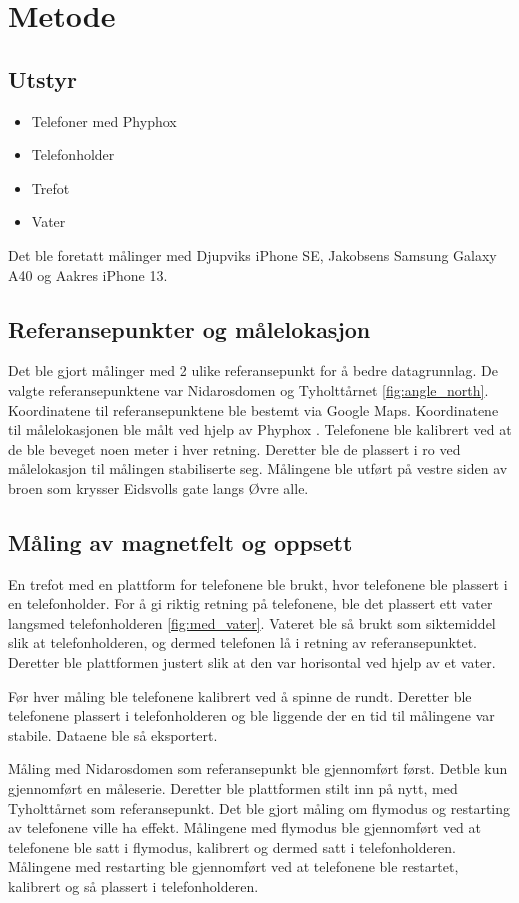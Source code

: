 \section{Metode}
\subsection{Utstyr}
\begin{itemize}
    \item Telefoner med Phyphox
    \item Telefonholder
    \item Trefot
    \item Vater
\end{itemize}
Det ble foretatt målinger med Djupviks iPhone SE, Jakobsens Samsung Galaxy A40 og Aakres iPhone 13. 

\subsection{Referansepunkter og målelokasjon}
Det ble gjort målinger med 2 ulike referansepunkt for å bedre datagrunnlag. De valgte referansepunktene var Nidarosdomen og Tyholttårnet \ref{fig:angle_north}. Koordinatene til referansepunktene ble bestemt via Google Maps. Koordinatene til målelokasjonen ble målt ved hjelp av Phyphox \cite{phyphox}. Telefonene ble kalibrert ved at de ble beveget noen meter i hver retning. Deretter ble de plassert i ro ved målelokasjon til målingen stabiliserte seg. Målingene ble utført på vestre siden av broen som krysser Eidsvolls gate langs Øvre alle. 


\subsection{Måling av magnetfelt og oppsett}
En trefot med en plattform for telefonene ble brukt, hvor telefonene ble plassert i en telefonholder. For å gi riktig retning på telefonene, ble det plassert ett vater langsmed telefonholderen \ref{fig:med_vater}. Vateret ble så brukt som siktemiddel slik at telefonholderen, og dermed telefonen lå i retning av referansepunktet. Deretter ble plattformen justert slik at den var horisontal ved hjelp av et vater.

Før hver måling ble telefonene kalibrert ved å spinne de rundt. Deretter ble telefonene plassert i telefonholderen og ble liggende der en tid til målingene var stabile. Dataene ble så eksportert. 

Måling med Nidarosdomen som referansepunkt ble gjennomført først. Detble kun gjennomført en måleserie. Deretter ble plattformen stilt inn på nytt, med Tyholttårnet som referansepunkt. Det ble gjort måling om flymodus og restarting av telefonene ville ha effekt. Målingene med flymodus ble gjennomført ved at telefonene ble satt i flymodus, kalibrert og dermed satt i telefonholderen. Målingene med restarting ble gjennomført ved at telefonene ble restartet, kalibrert og så plassert i telefonholderen.

